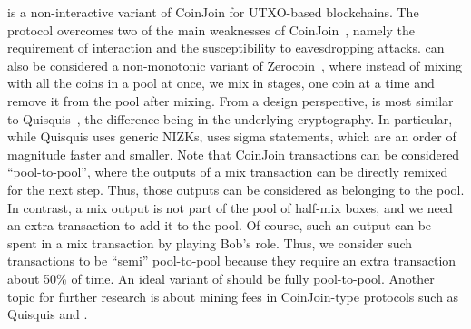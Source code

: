 \documentclass[runningheads]{llncs}
\newcommand{\zerocoin}{Zerocoin\xspace}
\begin{document}
\algname is a non-interactive variant of CoinJoin for UTXO-based blockchains. The protocol overcomes two of the main weaknesses of CoinJoin~\cite{coinjoin}, namely the requirement of 
interaction and the susceptibility to eavesdropping attacks. \algname can also be considered a non-monotonic variant of \zerocoin~\cite{zerocoin}, where instead of mixing with all the coins in a pool at once, we mix in stages, one coin at a time and remove it from the pool after mixing. 
From a design perspective, \algname is most similar to Quisquis~\cite{quisquis}, the difference being in the underlying cryptography. In particular, while Quisquis uses
generic NIZKs, \algname uses sigma statements, which are an order of magnitude faster and smaller. Note that CoinJoin transactions can be considered ``pool-to-pool'', where
the outputs of a mix transaction can be directly remixed for the next step. Thus, those outputs can be considered as belonging to the pool. In contrast, a \algname mix output
is not part of the pool of half-mix boxes, and we need an extra transaction to add it to the pool. 
Of course, such an output can be spent in a mix transaction by playing Bob's role. Thus, we consider such transactions to be ``semi'' pool-to-pool because they require an extra transaction about 50\% of time. An ideal variant of \algname should be fully pool-to-pool. Another topic for further research is about mining fees in CoinJoin-type protocols such as Quisquis and \algname.




\end{document}
